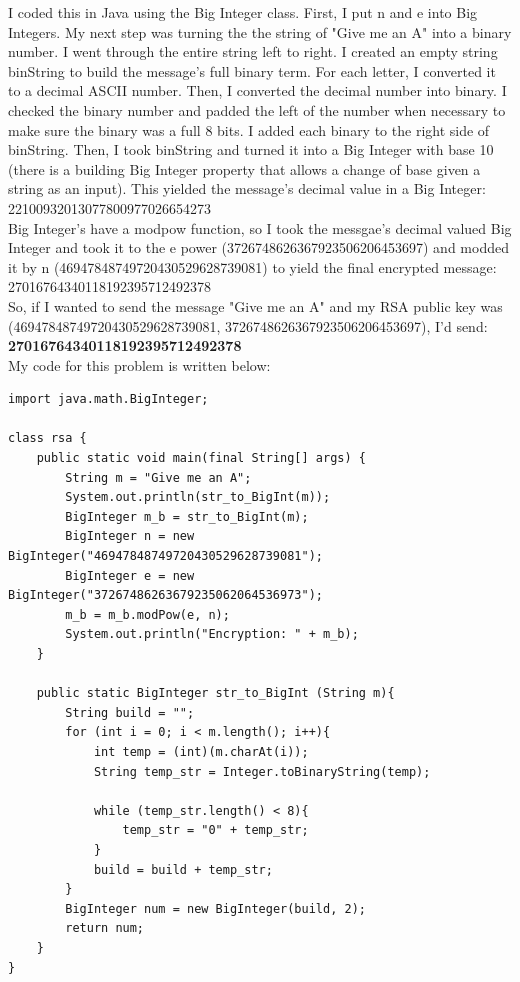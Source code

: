 \documentclass[11pt, solution, letterpaper]{format}
\begin{document}
I coded this in Java using the Big Integer class. First, I put n and e into Big Integers. My next step was turning the the string of "Give me an A" into a binary number. I went through the entire string left to right. I created an empty string binString to build the message's full binary term. For each letter, I converted it to a decimal ASCII number. Then, I converted the decimal number into binary. I checked the binary number and padded the left of the number when necessary to make sure the binary was a full 8 bits. I added each binary to the right side of binString. Then, I took binString and turned it into a Big Integer with base 10 (there is a building Big Integer property that allows a change of base given a string as an input). This yielded the message's decimal value in a Big Integer: 22100932013077800977026654273\\

Big Integer's have a modpow function, so I took the messgae's decimal valued Big Integer and took it to the e power (3726748626367923506206453697) and modded it by n (46947848749720430529628739081) to yield the final encrypted message:\\
27016764340118192395712492378\\

So, if I wanted to send the message "Give me an A" and my RSA public key was (46947848749720430529628739081, 3726748626367923506206453697), I'd send: \textbf{27016764340118192395712492378}\\

My code for this problem is written below:
\begin{lstlisting}
import java.math.BigInteger;

class rsa {
    public static void main(final String[] args) {            
        String m = "Give me an A";
        System.out.println(str_to_BigInt(m));
        BigInteger m_b = str_to_BigInt(m);
        BigInteger n = new BigInteger("46947848749720430529628739081");
        BigInteger e = new BigInteger("37267486263679235062064536973");
        m_b = m_b.modPow(e, n);
        System.out.println("Encryption: " + m_b);
    }

    public static BigInteger str_to_BigInt (String m){
        String build = "";
        for (int i = 0; i < m.length(); i++){
            int temp = (int)(m.charAt(i));
            String temp_str = Integer.toBinaryString(temp);

            while (temp_str.length() < 8){
                temp_str = "0" + temp_str;
            }
            build = build + temp_str;
        }
        BigInteger num = new BigInteger(build, 2);
        return num;
    }    
}
\end{lstlisting}
\end{document}

